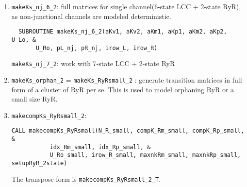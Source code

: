 \begin{enumerate}
\item \verb!makeKs_nj_6_2!: full matrices for single channel(6-state LCC +
2-state RyR), as non-junctional channels are modeled deterministic.
\begin{lstlisting}
  SUBROUTINE makeKs_nj_6_2(aKv1, aKv2, aKm1, aKp1, aKm2, aKp2, U_Lo, &
       U_Ro, pL_nj, pR_nj, irow_L, irow_R) 
\end{lstlisting}

\verb!makeKs_nj_7_2!: work with 7-state LCC + 2-state RyR

\item \verb!makeKs_orphan_2! = \verb!makeKs_RyRsmall_2! : generate transition
matrices in full form of a cluster of RyR per se. This is used to model
orphaning RyR or a small size RyR. 


\item \verb!makecompKs_RyRsmall_2!: 
\begin{verbatim}
CALL makecompKs_RyRsmall(N_R_small, compK_Rm_small, compK_Rp_small, &
           idx_Rm_small, idx_Rp_small, &
           U_Ro_small, irow_R_small, maxnkRm_small, maxnkRp_small, setupRyR_2state)
\end{verbatim}
The transpose form is \verb!makecompKs_RyRsmall_2_T!.
\end{enumerate}